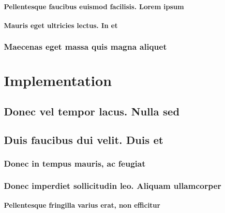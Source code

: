 \documentclass[%
  bachelor,%
  english%
  oneside,%
  debug,%
]{student}
\begin{document}
\lipsum[1-8]

\subsubsection{Pellentesque faucibus euismod facilisis. Lorem ipsum}

\lipsum[1-8]

\subsubsection{Mauris eget ultricies lectus. In et}

\lipsum[1-8]

\subsection{Maecenas eget massa quis magna aliquet}

\lipsum[1-8]





\chapter{Implementation}

\lipsum[1-8]

\section{Donec vel tempor lacus. Nulla sed}

\lipsum[1-8]

\section{Duis faucibus dui velit. Duis et}

\lipsum[1-8]

\subsection{Donec in tempus mauris, ac feugiat}

\lipsum[1-8]

\subsection{Donec imperdiet sollicitudin leo. Aliquam ullamcorper}

\lipsum[1-8]

\subsubsection{Pellentesque fringilla varius erat, non efficitur}
\end{document}
